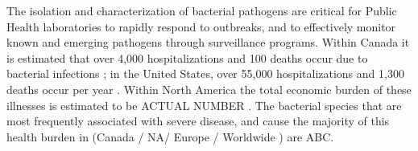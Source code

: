 \documentclass[a4,center,fleqn]{NAR}
\begin{document}

The isolation and characterization of bacterial pathogens are critical for Public Health laboratories to rapidly respond to outbreaks, and to effectively monitor known and emerging pathogens through surveillance programs.
Within Canada it is estimated that over 4,000 hospitalizations and 100 deaths occur due to bacterial infections \cite{thomas2015estimates}; in the United States, over 55,000 hospitalizations and 1,300 deaths occur per year \cite{scallan2011foodborne}. Within North America the total economic burden of these illnesses is estimated to be ACTUAL NUMBER \cite{todd1989costs,scharff2010health}.
The bacterial species that are most frequently associated with severe disease, and cause the majority of this health burden in (Canada / NA/ Europe / Worldwide ) are ABC.

\end{document}
